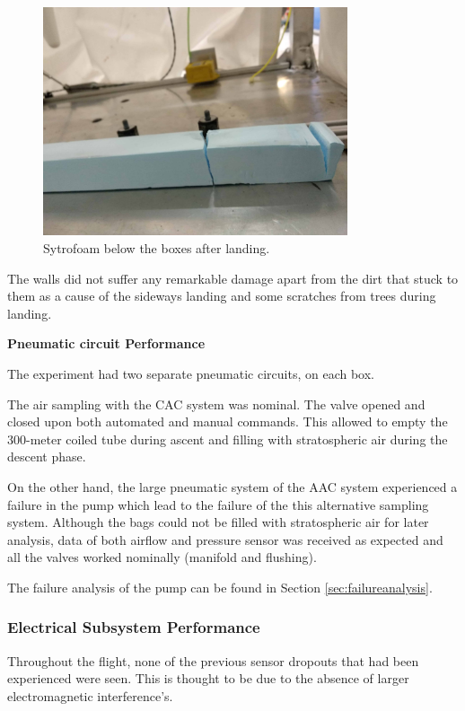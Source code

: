 \begin{figure}[H]
    \centering
    \includegraphics[width=0.8\textwidth]{7-data-analysis-and-results/img/Styrofoam_Post_Flight.jpg}
    \caption{Sytrofoam below the boxes after landing.}
    \label{fig:styrofoam_landing}
\end{figure}

The walls did not suffer any remarkable damage apart from the dirt that stuck to them as a cause of the sideways landing and some scratches from trees during landing. 


\textbf{Pneumatic circuit Performance}

\smallskip
The experiment had two separate pneumatic circuits, on each box. 

The air sampling with the CAC system was nominal. The valve opened and closed upon both automated and manual commands. This allowed to empty the 300-meter coiled tube during ascent and filling with stratospheric air during the descent phase.

On the other hand, the large pneumatic system of the AAC system experienced a failure in the pump which lead to the failure of the this alternative sampling system. Although the bags could not be filled with stratospheric air for later analysis, data of both airflow and pressure sensor was received as expected and all the valves worked nominally (manifold and flushing). 

The failure analysis of the pump can be found in Section \ref{sec:failureanalysis}.

\subsubsection{Electrical Subsystem Performance}

Throughout the flight, none of the previous sensor dropouts that had been experienced were seen. This is thought to be due to the absence of larger electromagnetic interference's.

